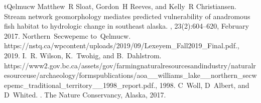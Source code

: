 \documentclass[letterpaper,10pt,english]{jupyterBook}
\begin{document}
\begin{sphinxthebibliography}{tQelmucw}
\sphinxAtStartPar
Matthew R Sloat, Gordon H Reeves, and Kelly R Christiansen. Stream network geomorphology mediates predicted vulnerability of anadromous fish habitat to hydrologic change in southeast alaska. , 23(2):604–620, February 2017.
\sphinxAtStartPar
Northern Secwepemc to Qelmucw.  https://nstq.ca/wp\sphinxhyphen{}content/uploads/2019/09/Lexeyem\_Fall\sphinxhyphen{}2019\_Final.pdf., 2019.
\sphinxAtStartPar
I. R. Wilson, K. Twohig, and B. Dahlstrom.  https://www2.gov.bc.ca/assets/gov/farming\sphinxhyphen{}natural\sphinxhyphen{}resources\sphinxhyphen{}and\sphinxhyphen{}industry/natural\sphinxhyphen{}resource\sphinxhyphen{}use/archaeology/forms\sphinxhyphen{}publications/aoa\_\sphinxhyphen{}\_williams\_lake\_\sphinxhyphen{}\_northern\_secwepemc\_traditional\_territory\_\sphinxhyphen{}\_1998\_report.pdf., 1998.
\sphinxAtStartPar
C Woll, D Albert, and D Whited. . The Nature Conservancy, Alaska, 2017.
\end{sphinxthebibliography}







\renewcommand{\indexname}{Index}
\printindex
\end{document}

